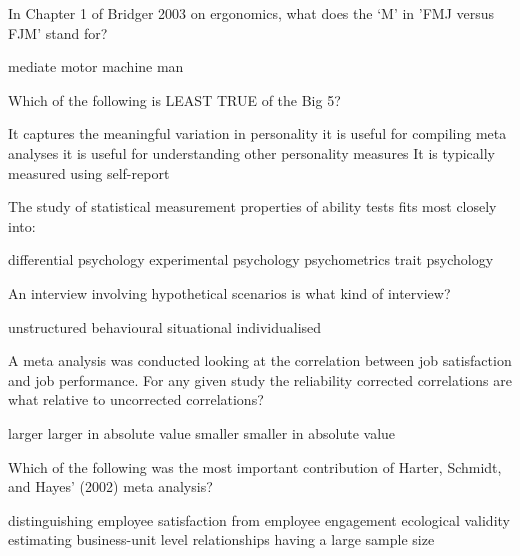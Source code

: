 \documentclass[12pt, a4paper]{exam}\usepackage[]{graphicx}\usepackage[]{color}
\begin{document}
\begin{questions}
\filbreak
\question
 In Chapter 1 of Bridger 2003 on ergonomics, what does the `M' in 'FMJ versus FJM' stand for?
\begin{choices}
\choice mediate
\choice motor
\choice machine
\choice man
\vspace{10 mm}
\end{choices}


\filbreak
\question
 Which of the following is LEAST TRUE of the Big 5?
\begin{choices}
\choice It captures the meaningful variation in personality
\choice it is useful for compiling meta analyses
\choice it is useful for understanding other personality measures
\choice It is typically measured using self-report
\vspace{10 mm}
\end{choices}


\filbreak
\question
 The study of statistical measurement properties of ability tests fits most closely into:
\begin{choices}
\choice differential psychology
\choice experimental psychology
\choice psychometrics
\choice trait psychology
\vspace{10 mm}
\end{choices}


\filbreak
\question
 An interview involving hypothetical scenarios is what kind of interview?
\begin{choices}
\choice unstructured
\choice behavioural
\choice situational
\choice individualised
\vspace{10 mm}
\end{choices}


\filbreak
\question
 A meta analysis was conducted looking at the correlation between job satisfaction and job performance. For any given study the reliability corrected correlations are what relative to uncorrected correlations?
\begin{choices}
\choice larger
\choice larger in absolute value
\choice smaller
\choice smaller in absolute value
\vspace{10 mm}
\end{choices}


\filbreak
\question
 Which of the following was the most important contribution of Harter, Schmidt, and Hayes' (2002) meta analysis?
\begin{choices}
\choice distinguishing employee satisfaction from employee engagement
\choice ecological validity
\choice estimating business-unit level relationships
\choice having a large sample size
\vspace{10 mm}
\end{choices}



\end{questions}
\end{document}
